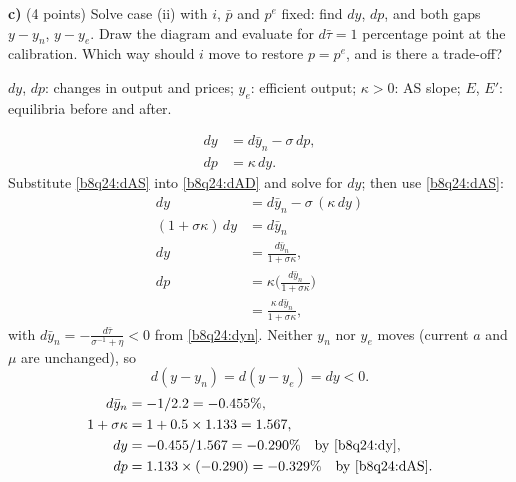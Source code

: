 \textbf{c)} (4 points) Solve case (ii) with $i$, $\bar p$ and $p^e$ fixed: find $dy$, $dp$, and both gaps $y-y_n$, $y-y_e$. Draw the diagram and
evaluate for $d\bar\tau=1$ percentage point at the calibration. Which way should $i$ move to restore $p=p^e$, and is there a trade-off?
\resolespaco
\begin{sol}
\begin{notacao}
\item $dy$, $dp$: changes in output and prices; $y_e$: efficient output; $\kappa>0$: AS slope; $E$, $E'$: equilibria before and after.
\end{notacao}
\begin{align}
dy&=d\bar y_n-\sigma\,dp, \label{b8q24:dAD}\\
dp&=\kappa\,dy. \label{b8q24:dAS}
\end{align}
Substitute \eqref{b8q24:dAS} into \eqref{b8q24:dAD} and solve for $dy$; then use \eqref{b8q24:dAS}:
\begin{align}
dy&=d\bar y_n-\sigma\,(\kappa\,dy)\nonumber\\
(1+\sigma\kappa)\,dy&=d\bar y_n\nonumber\\
dy&=\frac{d\bar y_n}{1+\sigma\kappa}, \label{b8q24:dy}\\
dp&=\kappa\Big(\frac{d\bar y_n}{1+\sigma\kappa}\Big)\nonumber\\
&=\frac{\kappa\,d\bar y_n}{1+\sigma\kappa}, \label{b8q24:dp}
\end{align}
with $d\bar y_n=-\frac{d\bar\tau}{\sigma^{-1}+\eta}<0$ from \eqref{b8q24:dyn}. Neither $y_n$ nor $y_e$ moves (current $a$ and $\mu$ are unchanged), so
\[
d(y-y_n)=d(y-y_e)=dy<0 .
\]
\begin{align*}
d\bar y_n&=-1/2.2=-0.455\%,\\
1+\sigma\kappa&=1+0.5\times1.133=1.567,\\
dy&=-0.455/1.567=-0.290\%\quad\text{by \eqref{b8q24:dy}},\\
dp&=1.133\times(-0.290)=-0.329\%\quad\text{by \eqref{b8q24:dAS}}.
\end{align*}
\begin{center}
\end{center}
\end{sol}
